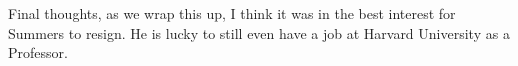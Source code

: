 
\par
Final thoughts, as we wrap this up, I think it was in the best interest for
Summers to resign. He is lucky to still even have a job at Harvard University
as a Professor.

\clearpage